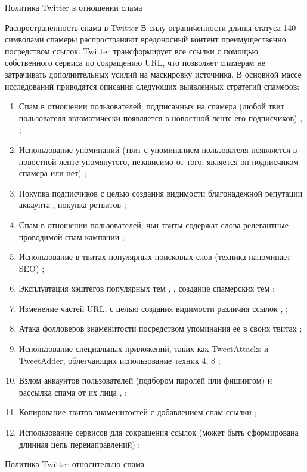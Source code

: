 \begin{section}{Политика Twitter в отношении спама}
\begin{subsection}{Распространенность спама в Twitter}
В силу ограниченности длины статуса 140 символами
спамеры распространяют вредоносный контент преимущественно
посредством ссылок. Twitter трансформирует все ссылки
с помощью собственного сервиса по сокращению URL,
что позволяет спамерам не затрачивать дополнительных усилий
на маскировку источника.
В основной массе исследований приводятся описания
следующих выявленных стратегий спамеров:
\begin{enumerate}
\item Спам в отношении пользователей,
подписанных на спамера
(любой твит пользователя автоматически появляется в
новостной ленте его подписчиков) \cite{Vasumathi}, \cite{Kurt};
\item Использование упоминаний
(твит с упоминанием пользователя появляется в новостной
ленте упомянутого, независимо от того,
является он подписчиком спамера или нет) \cite{Kurt};
\item Покупка подписчиков с целью создания видимости благонадежной репутации аккаунта \cite{Vasumathi},
покупка ретвитов \cite{Grier};
\item Спам в отношении пользователей, чьи твиты содержат слова релевантные проводимой спам-кампании
\cite{Vasumathi};
\item Использование в твитах популярных поисковых слов (техника напоминает SEO) \cite{Kurt};
\item Эксплуатация хэштегов популярных тем \cite{Kurt}, \cite{Martinez}, создание спамерских тем \cite{Grier};
\item Изменение частей URL, с целью создания видимости различия ссылок \cite{Vasumathi}, \cite{Lee};
\item Атака фолловеров знаменитости посредством упоминания ее в своих твитах \cite{Vasumathi};
\item Использование специальных приложений, таких как TweetAttacks и TweetAdder,
облегчающих использование техник 4, 8 \cite{Vasumathi};
\item Взлом аккаунтов пользователей (подбором паролей или фишингом) и рассылка спама от
их лица \cite{Grier}, \cite{Martinez};
\item Копирование твитов знаменитостей с добавлением спам-ссылки \cite{Grier};
\item Использование сервисов для сокращения ссылок (может быть сформирована длинная
цепь перенаправлений) \cite{Grier};
\end{enumerate}
\end{subsection}
\begin{subsection}{Политика Twitter относительно спама}

\end{subsection}
\end{section}
